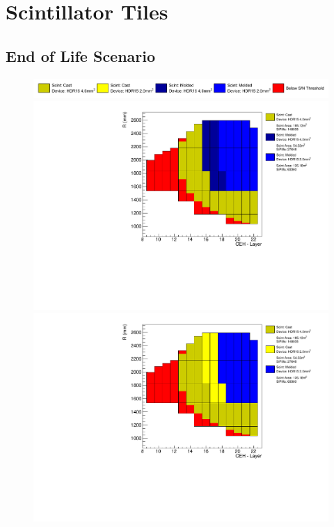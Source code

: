 \section{
  Scintillator Tiles
 }


\subsection{
  End of Life Scenario
}

\begin{figure}[!ht]
  \centering
  \includegraphics[width=\textwidth]{figures/hgcal/scenes_legend.pdf}
  \begin{minipage}[c]{0.49\textwidth}
    \includegraphics[trim={0 0 165pt 0},clip,width=\textwidth]{figures/hgcal/sceneA_jan20_2.pdf}
  \end{minipage}
  \begin{minipage}[c]{0.49\textwidth}
    \includegraphics[trim={0 0 165pt 0},clip,width=\textwidth]{figures/hgcal/sceneB_jan20_2.pdf}

\end{minipage}
\end{figure}
